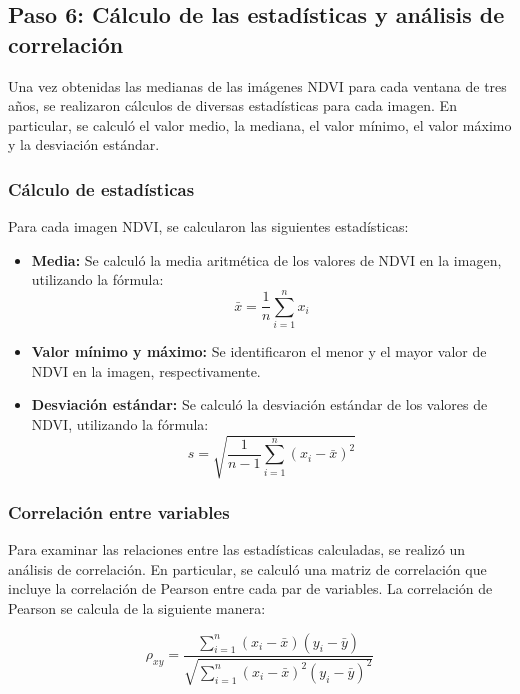 {\small
\subsection{Paso 6: Cálculo de las estadísticas y análisis de correlación}

Una vez obtenidas las  medianas de las imágenes NDVI para cada ventana de tres años, se realizaron cálculos de diversas estadísticas para cada imagen. En particular, se calculó el valor medio, la mediana, el valor mínimo, el valor máximo y la desviación estándar.

\subsubsection{Cálculo de estadísticas}

Para cada imagen NDVI, se calcularon las siguientes estadísticas:

\begin{itemize}
    \item \textbf{Media:} Se calculó la media aritmética de los valores de NDVI en la imagen, utilizando la fórmula:
    \begin{equation}
    \bar{x} = \frac{1}{n} \sum_{i=1}^{n} x_i
    \end{equation}
    
    \item \textbf{Valor mínimo y máximo:} Se identificaron el menor y el mayor valor de NDVI en la imagen, respectivamente.
    
    \item \textbf{Desviación estándar:} Se calculó la desviación estándar de los valores de NDVI, utilizando la fórmula:
    \begin{equation}
    s = \sqrt{\frac{1}{n-1} \sum_{i=1}^{n} (x_i - \bar{x})^2}
    \end{equation}
\end{itemize}

\subsubsection{Correlación entre variables}

Para examinar las relaciones entre las estadísticas calculadas, se realizó un análisis de correlación. En particular, se calculó una matriz de correlación que incluye la correlación de Pearson entre cada par de variables. La correlación de Pearson se calcula de la siguiente manera:

\begin{equation}
\rho_{xy} = \frac{\sum_{i=1}^{n} (x_i-\bar{x})(y_i-\bar{y})}{\sqrt{\sum_{i=1}^{n} (x_i-\bar{x})^2(y_i-\bar{y})^2}}
\end{equation}

}
